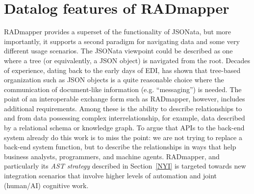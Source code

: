 \documentclass[9pt,letterpaper]{article}
\begin{document}
\section{Datalog features of RADmapper} %



RADmapper provides a superset of the functionality of JSONata, but more importantly, it supports a second paradigm for navigating data and some very different usage scenarios.
The JSONata viewpoint could be described as one where a tree (or equivalently, a JSON object) is navigated from the root.
Decades of experience, dating back to the early days of EDI, has shown that tree-based organization such as JSON objects is a quite reasonable choice where the communication of document-like information (e.g. ``messaging'') is needed.
The point of an interoperable exchange form such as RADmapper, however, includes additional requirements.
Among these is the ability to describe relationships to and from data possessing complex interrelationship, for example, data described by a relational schema or knowledge graph.
To argue that APIs to the back-end system already do this work is to miss the point:
we are not trying to replace a back-end system function, but to describe the relationships in ways that help business analysts, programmers, and machine agents.
RADmapper, and particularly its \textit{AST strategy} described in Section~\ref{NYI} is targeted towards new integration scenarios that involve higher levels of automation and joint (human/AI) cognitive work.

\end{document}
